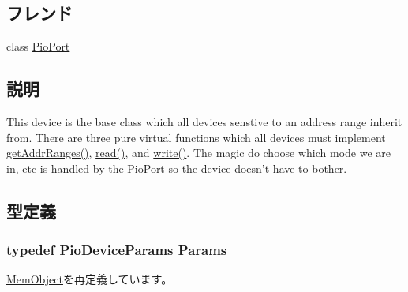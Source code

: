 \subsection*{フレンド}
\begin{DoxyCompactItemize}
\item 
class \hyperlink{classPioDevice_a943f3d8eaf2e9b90571c1f8d4ec74b98}{PioPort}
\end{DoxyCompactItemize}


\subsection{説明}
This device is the base class which all devices senstive to an address range inherit from. There are three pure virtual functions which all devices must implement \hyperlink{classPioDevice_a6e967f8921e80748eb2be35b6b481a7e}{getAddrRanges()}, \hyperlink{classPioDevice_a842312590432036092c422c87a442358}{read()}, and \hyperlink{classPioDevice_afe8371668d023bb2516b286e5e399b6f}{write()}. The magic do choose which mode we are in, etc is handled by the \hyperlink{classPioPort}{PioPort} so the device doesn't have to bother. 

\subsection{型定義}
\hypertarget{classPioDevice_a9cdbda5b5cc24147ce82b7d07bf03cd1}{
\subsubsection[{Params}]{\setlength{\rightskip}{0pt plus 5cm}typedef PioDeviceParams {\bf Params}}}
\label{classPioDevice_a9cdbda5b5cc24147ce82b7d07bf03cd1}


\hyperlink{classMemObject_a905bbc621eeec0ed08859e21c8c95412}{MemObject}を再定義しています。

